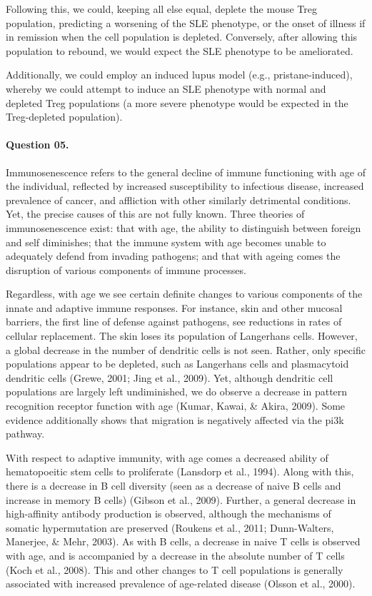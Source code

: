 \documentclass[11pt,letterpaper,final] {article}
\begin{document}
Following this, we could, keeping all else equal, deplete the mouse Treg population, predicting a worsening of the SLE phenotype, or the onset of illness if in remission when the cell population is depleted. Conversely, after allowing this population to rebound, we would expect the SLE phenotype to be ameliorated.

Additionally, we could employ an induced lupus model (e.g., pristane-induced), whereby we could attempt to induce an SLE phenotype with normal and depleted Treg populations (a more severe phenotype would be expected in the Treg-depleted population).

\paragraph{Question 05.} Immunosenescence refers to the general decline of immune functioning with age of the individual, reflected by increased susceptibility to infectious disease, increased prevalence of cancer, and affliction with other similarly detrimental conditions. Yet, the precise causes of this are not fully known. Three theories of immunosenescence exist: that with age, the ability to distinguish between foreign and self diminishes; that the immune system with age becomes unable to adequately defend from invading pathogens; and that with ageing comes the disruption of various components of immune processes.

Regardless, with age we see certain definite changes to various components of the innate and adaptive immune responses. For instance, skin and other mucosal barriers, the first line of defense against pathogens, see reductions in rates of cellular replacement. The skin loses its population of Langerhans cells. However, a global decrease in the number of dendritic cells is not seen. Rather, only specific populations appear to be depleted, such as Langerhans cells and plasmacytoid dendritic cells (Grewe, 2001; Jing et al., 2009). Yet, although dendritic cell populations are largely left undiminished, we do observe a decrease in pattern recognition receptor function with age (Kumar, Kawai, \& Akira, 2009). Some evidence additionally shows that migration is negatively affected via the pi3k pathway.

With respect to adaptive immunity, with age comes a decreased ability of hematopoeitic stem cells to proliferate (Lansdorp et al., 1994). Along with this, there is a decrease in B cell diversity (seen as a decrease of naive B cells and increase in memory B cells) (Gibson et al., 2009). Further, a general decrease in high-affinity antibody production is observed, although the mechanisms of somatic hypermutation are preserved (Roukens et al., 2011; Dunn-Walters, Manerjee, \& Mehr, 2003). As with B cells, a decrease in naive T cells is observed with age, and is accompanied by a decrease in the absolute number of T cells (Koch et al., 2008). This and other changes to T cell populations is generally associated with increased prevalence of age-related disease (Olsson et al., 2000).
\end{document}
